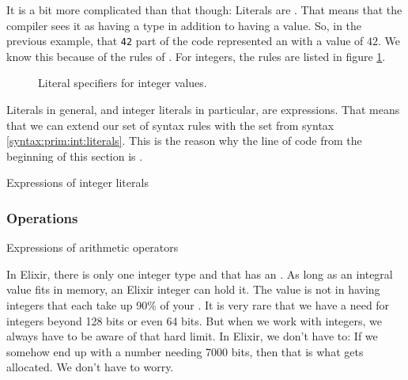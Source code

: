 It is a bit more complicated than that though: Literals are . That means that the compiler sees it as having a type in addition to having a value. So, in the previous example, that \texttt{42} part of the code represented an  with a value of $42$. We know this because of the  rules of \csharp. For integers, the rules are listed in figure \ref{fig:primitives:int:literals}.

\begin{figure}[tbp]
  
  \caption{Literal specifiers for integer values.}
  \label{fig:primitives:int:literals}
\end{figure}

Literals in general, and integer literals in particular, are expressions. That means that we can extend our set of syntax rules with the set from syntax \ref{syntax:prim:int:literals}. This is the reason why the line of code from the beginning of this section is .

\begin{syntaxfloat}
  
  \caption{Expressions of integer literals}
  \label{syntax:prim:int:literals}
\end{syntaxfloat}

\subsubsection{Operations}


\begin{syntaxfloat}
  
  \caption{Expressions of arithmetic operators}
  \label{syntax:prim:arithmetic:ops}
\end{syntaxfloat}



In Elixir, there is only one integer type and that has an . As long as an integral value fits in memory, an Elixir integer can hold it. The value is not in having integers that each take up 90\% of your . It is very rare that we have a need for integers beyond 128 bits or even 64 bits. But when we work with  integers, we always have to be aware of that hard limit. In Elixir, we don't have to: If we somehow end up with a number needing 7000 bits, then that is what gets allocated. We don't have to worry.

